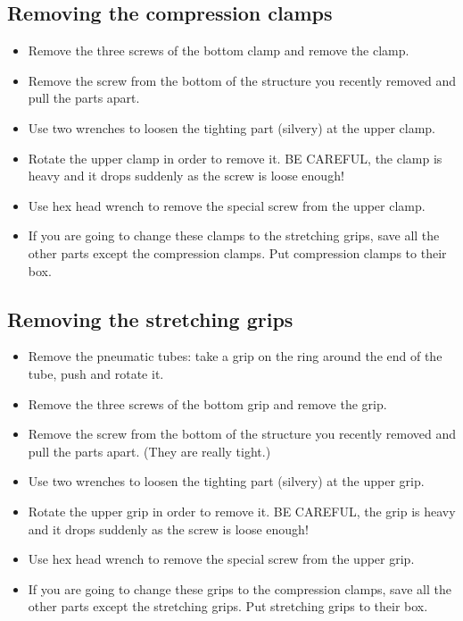 \documentclass[a4paper]{article}
\begin{document}
\subsection{Removing the compression clamps}

\begin{itemize}
  \item Remove the three screws of the bottom clamp and remove the clamp.
  \item Remove the screw from the bottom of the structure you recently removed and pull the parts apart.
  \item Use two wrenches to loosen the tighting part (silvery) at the upper clamp.
  \item Rotate the upper clamp in order to remove it. BE CAREFUL, the clamp is heavy and it drops suddenly as the screw is loose enough!
  \item Use hex head wrench to remove the special screw from the upper clamp.
  \item If you are going to change these clamps to the stretching grips, save all the other parts except the compression clamps. Put compression clamps to their box.
\end{itemize}

\subsection{Removing the stretching grips}

\begin{itemize}
  \item Remove the pneumatic tubes: take a grip on the ring around the end of the tube, push and rotate it.
  \item Remove the three screws of the bottom grip and remove the grip.
  \item Remove the screw from the bottom of the structure you recently removed and pull the parts apart. (They are really tight.)
  \item Use two wrenches to loosen the tighting part (silvery) at the upper grip.
  \item Rotate the upper grip in order to remove it. BE CAREFUL, the grip is heavy and it drops suddenly as the screw is loose enough!
  \item Use hex head wrench to remove the special screw from the upper grip.
  \item If you are going to change these grips to the compression clamps, save all the other parts except the stretching grips. Put stretching grips to their box.
\end{itemize}
\end{document}
